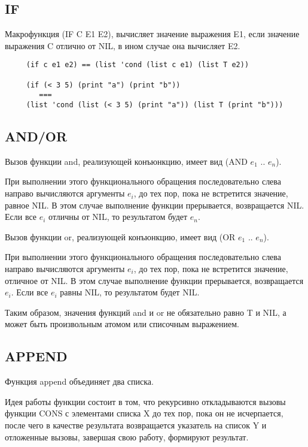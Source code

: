 \subsection{IF}

Макрофункция (IF C E1 E2), вычисляет значение выражения E1, если значение выражения C отлично от NIL, в ином случае она вычисляет E2.

\begin{lstlisting}
     (if c e1 e2) == (list 'cond (list c e1) (list T e2))

     (if (< 3 5) (print "a") (print "b"))
        ===
     (list 'cond (list (< 3 5) (print "a")) (list T (print "b")))
\end{lstlisting}

\subsection{AND/OR}

Вызов функции and, реализующей конъюнкцию, имеет вид (AND $e_1$ .. $e_n$). 

При выполнении этого функционального обращения последовательно слева направо вычисляются аргументы $e_i$, до тех пор, пока не встретится значение, равное NIL. В этом случае выполнение функции прерывается, возвращается NIL. Если все $e_i$ отличны от NIL, то результатом будет $e_n$.

\text{\newline}

Вызов функции or, реализующей конъюнкцию, имеет вид (OR $e_1$ .. $e_n$). 

При выполнении этого функционального обращения последовательно слева направо вычисляются аргументы $e_i$, до тех пор, пока не встретится значение, отличное от NIL. В этом случае выполнение функции прерывается, возвращается $e_i$. Если все $e_i$ равны NIL, то результатом будет NIL.

\text{\newline}

Таким образом, значения функций and и or не обязательно равно T и NIL, а может быть произвольным атомом или списочным выражением. 

\subsection{APPEND}

Функция append объединяет два списка. 

Идея работы функции состоит в том, что рекурсивно откладываются вызовы функции CONS с элементами списка X до тех пор, пока он не исчерпается, после чего в качестве результата возвращается указатель на список Y и отложенные вызовы, завершая свою работу, формируют результат.

